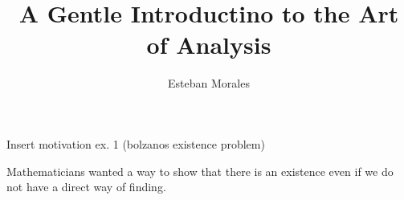 \documentclass[12pt]{article}
\theoremstyle{definition}
\newenvironment{statement}[2][Section]{\begin{trivlist}
\item[\hskip \labelsep {\bfseries #1}\hskip \labelsep {\bfseries #2.}]}{\end{trivlist}}
\begin{document}
\newtheorem{theorem}{Theorem} 
%
%
 
\title{A Gentle Introductino to the Art of Analysis } %
\author{Esteban Morales} %
\maketitle


\begin{statement}{Chapter 1} %

Insert motivation ex. 1 (bolzanos existence problem)

Mathematicians wanted a way to show that there is an existence even if we do not have a 
direct way of finding.






\end{statement}
 
\end{document}
